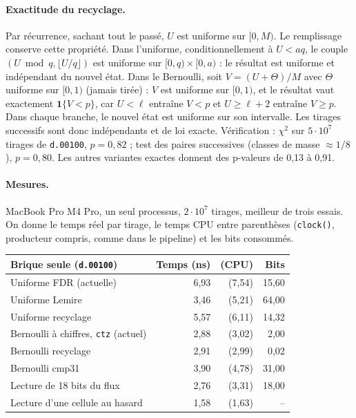 \documentclass[11pt,a4paper]{article}
\newcommand{\code}[1]{\texttt{#1}}
\begin{document}
\paragraph{Exactitude du recyclage.} Par récurrence, sachant tout le passé, $U$ est
uniforme sur $[0, M)$. Le remplissage conserve cette propriété. Dans l'uniforme,
conditionnellement à $U < aq$, le couple $(U \bmod q, \lfloor U/q \rfloor)$ est
uniforme sur $[0,q) \times [0,a)$ : le résultat est uniforme et indépendant du nouvel
état. Dans le Bernoulli, soit $V = (U + \Theta)/M$ avec $\Theta$ uniforme sur $[0,1)$
(jamais tirée) : $V$ est uniforme sur $[0, 1)$, et le résultat vaut exactement
$\mathbf{1}\{V < p\}$, car $U < \ell$ entraîne $V < p$ et $U \ge \ell+2$ entraîne
$V \ge p$. Dans chaque branche, le nouvel état est uniforme sur son intervalle. Les
tirages successifs sont donc indépendants et de loi exacte. Vérification : $\chi^2$ sur
$5\cdot 10^7$ tirages de \code{d.00100}, $p = 0{,}82$ ; test des paires successives
(classes de masse $\approx 1/8$), $p = 0{,}80$. Les autres variantes exactes donnent des
p-valeurs de 0,13 à 0,91.

\paragraph{Mesures.} MacBook Pro M4 Pro, un seul processus, $2\cdot 10^7$ tirages,
meilleur de trois essais. On donne le temps réel par tirage, le temps CPU entre
parenthèses (\code{clock()}, producteur compris, comme dans le pipeline) et les bits
consommés.

\begin{table}[H]
\centering
\small
\begin{tabular}{lrrr}
\toprule
Brique seule (\code{d.00100}) & Temps (ns) & (CPU) & Bits \\
\midrule
Uniforme FDR (actuelle)  & 6,93 & (7,54) & 15,60 \\
Uniforme Lemire          & 3,46 & (5,21) & 64,00 \\
Uniforme recyclage       & 5,57 & (6,11) & 14,32 \\
\midrule
Bernoulli à chiffres, \code{ctz} (actuel) & 2,88 & (3,02) & 2,00 \\
Bernoulli recyclage      & 2,91 & (2,99) & 0,02 \\
Bernoulli cmp31          & 3,90 & (4,78) & 31,00 \\
\midrule
Lecture de 18 bits du flux & 2,76 & (3,31) & 18,00 \\
Lecture d'une cellule au hasard & 1,58 & (1,63) & -- \\
\bottomrule
\end{tabular}
\end{table}
\end{document}
